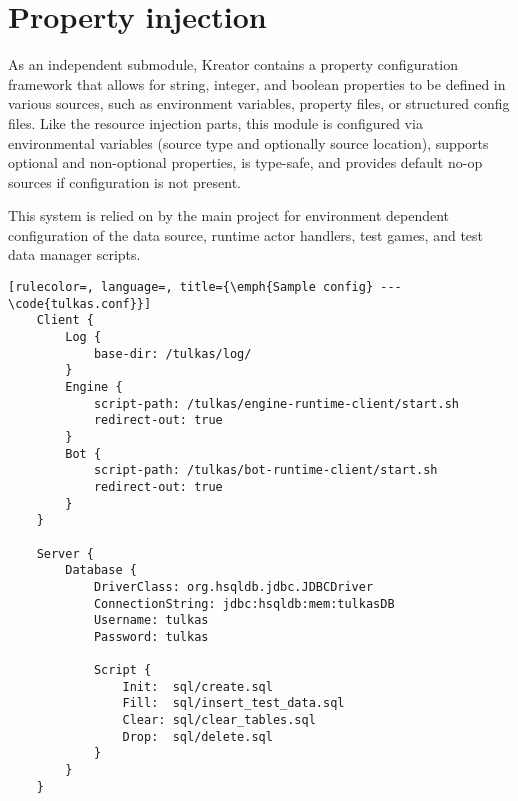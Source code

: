 	
	
	\section{Property injection}
	
	As an independent submodule, Kreator contains a property configuration framework that allows for string, integer, and boolean properties to be defined in various sources, such as environment variables, property files, or structured config files. Like the resource injection parts, this module is configured via environmental variables (source type and optionally source location), supports optional and non-optional properties, is type-safe, and provides default no-op sources if configuration is not present.
	
	This system is relied on by the main project for environment dependent configuration of the data source, runtime actor handlers, test games, and test data manager scripts.
	
		\begin{center}
			\begin{minipage}{13.5cm}
		\begin{lstlisting}[rulecolor=, language=, title={\emph{Sample config} --- \code{tulkas.conf}}]
	Client {
		Log {
			base-dir: /tulkas/log/
		}
		Engine {
        	script-path: /tulkas/engine-runtime-client/start.sh
        	redirect-out: true
		}
		Bot {
        	script-path: /tulkas/bot-runtime-client/start.sh
        	redirect-out: true
    	}
	}
	
	Server {
		Database {
        	DriverClass: org.hsqldb.jdbc.JDBCDriver
        	ConnectionString: jdbc:hsqldb:mem:tulkasDB
        	Username: tulkas
        	Password: tulkas

        	Script {
            	Init:  sql/create.sql
            	Fill:  sql/insert_test_data.sql
            	Clear: sql/clear_tables.sql
            	Drop:  sql/delete.sql
        	}
    	}
	}
		\end{lstlisting}
			\end{minipage}
		\end{center}
		
